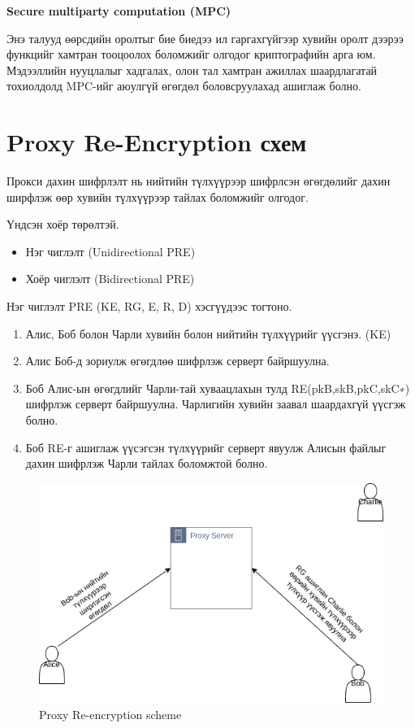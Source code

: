 \textbf{Secure multiparty computation (MPC)}

Энэ талууд өөрсдийн оролтыг бие биедээ ил гаргахгүйгээр хувийн оролт дээрээ функцийг хамтран тооцоолох боломжийг олгодог криптографийн арга юм. Мэдээллийн нууцлалыг хадгалах, олон тал хамтран ажиллах шаардлагатай тохиолдолд MPC-ийг аюулгүй өгөгдөл боловсруулахад ашиглаж болно.


\section{Proxy Re-Encryption схем}

Прокси дахин шифрлэлт нь нийтийн түлхүүрээр шифрлсэн өгөгдөлийг дахин ширфлэж өөр хувийн түлхүүрээр тайлах боломжийг олгодог.

Үндсэн хоёр төрөлтэй.
\begin{itemize}
    \item Нэг чиглэлт (Unidirectional PRE)
    \item Хоёр чиглэлт (Bidirectional PRE)
\end{itemize}

Нэг чиглэлт PRE (KE, RG, E, R, D) хэсгүүдээс тогтоно.

\begin{enumerate}
    \item Алис, Боб болон Чарли хувийн болон нийтийн түлхүүрийг үүсгэнэ. (KE)
    \item Алис Боб-д зориулж өгөгдлөө шифрлэж серверт байршуулна.
    \item Боб Алис-ын өгөгдлийг Чарли-тай хуваацлахын тулд RE(pkB,skB,pkC,skC∗) шифрлэж серверт байршуулна. Чарлигийн хувийн заавал шаардахгүй үүсгэж болно.
    \item Боб RE-г ашиглаж үүсэгсэн түлхүүрийг серверт явуулж Алисын файлыг дахин шифрлэж Чарли тайлах боломжтой болно.
\end{enumerate}

\begin{figure}[ht]
\centering
\includegraphics[scale=0.5]{Figures/pre}
\caption[Proxy Re-encryption scheme]{Proxy Re-encryption scheme}
\label{fig:PRE_Scheme}
\end{figure}


